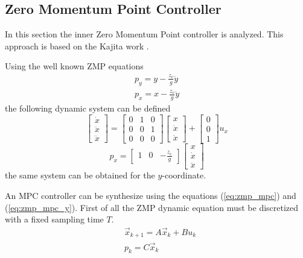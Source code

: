 \subsection{Zero Momentum Point Controller}
In this section the inner Zero Momentum Point controller is analyzed. This approach is based on the
Kajita work \cite{Kajita2003}.
\par
Using the well known ZMP equations
\[
\begin{split}
  p_y = y - \frac{z_c}{g} \ddot{y}\\
  p_x = x - \frac{z_c}{g} \ddot{y}
\end{split}
\]
the following dynamic system can be defined
\begin{equation}
  \label{eq:zmp_mpc}
  \begin{bmatrix}
    \dot{x} \\
    \ddot{x} \\
    \dddot{x}
  \end{bmatrix} =
  \begin{bmatrix}
    0 & 1 & 0 \\
    0 & 0 & 1 \\
    0 & 0 & 0
  \end{bmatrix}
  \begin{bmatrix}
    x \\
    \dot{x} \\
    \ddot{x}
  \end{bmatrix}
  +
  \begin{bmatrix}
    0 \\
    0 \\
    1 
  \end{bmatrix}
  u_x
\end{equation}
\begin{equation}
  \label{eq:zmp_mpc_y}
  p_x =
  \begin{bmatrix}
    1 & 0 & -\frac{z_c}{g}
  \end{bmatrix}
  \begin{bmatrix}
    x \\
    \dot{x} \\
    \ddot{x}
  \end{bmatrix}
\end{equation}
the same system can be obtained for the $y$-coordinate.
\par
An MPC controller can be synthesize using the equations (\ref{eq:zmp_mpc}) and (\ref{eq:zmp_mpc_y}).
First of all the ZMP dynamic equation must be discretized with a fixed sampling time $T$.
\[
\begin{split}
  &\vec{x}_{k + 1} = A \vec{x}_k + B u_k\\
  &p_k = C \vec{x}_{k}
\end{split}
\]

